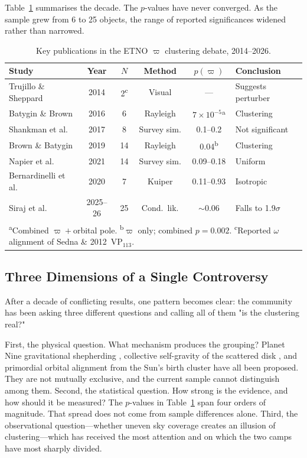 \documentclass[usenatbib]{mnras}
\begin{document}
Table~\ref{tab:timeline} summarises the decade. The $p$-values have never converged. As the sample grew from 6 to 25 objects, the range of reported significances widened rather than narrowed.

\begin{table}[htbp]
\centering
\caption{Key publications in the ETNO $\varpi$ clustering debate, 2014--2026.}
\label{tab:timeline}
\footnotesize
\begin{tabular}{p{2.8cm}ccccp{2.8cm}}
\hline
Study & Year & $N$ & Method & $p(\varpi)$ & Conclusion \\
\hline
Trujillo \& Sheppard \cite{trujillo2014} & 2014 & 2\textsuperscript{c} & Visual & --- & Suggests perturber \\
Batygin \& Brown \cite{batygin2016} & 2016 & 6 & Rayleigh & $7{\times}10^{-5}$\textsuperscript{a} & Clustering \\
Shankman et al.\ \cite{shankman2017} & 2017 & 8 & Survey sim. & 0.1--0.2 & Not significant \\
Brown \& Batygin \cite{brown2019} & 2019 & 14 & Rayleigh & 0.04\textsuperscript{b} & Clustering \\
Napier et al.\ \cite{napier2021} & 2021 & 14 & Survey sim. & 0.09--0.18 & Uniform \\
Bernardinelli et al.\ \cite{bernardinelli2020} & 2020 & 7 & Kuiper & 0.11--0.93 & Isotropic \\
Siraj et al.\ \cite{siraj2025,siraj2026} & 2025--26 & 25 & Cond.\ lik. & $\sim$0.06 & Falls to 1.9$\sigma$ \\
\hline
\multicolumn{6}{l}{\footnotesize\textsuperscript{a}Combined $\varpi{+}$orbital pole. \textsuperscript{b}$\varpi$ only; combined $p{=}0.002$. \textsuperscript{c}Reported $\omega$ alignment of Sedna \& 2012~VP$_{113}$.} \\
\end{tabular}
\end{table}

\subsection{Three Dimensions of a Single Controversy}

After a decade of conflicting results, one pattern becomes clear: the community has been asking three different questions and calling all of them "is the clustering real?"

First, the physical question. What mechanism produces the grouping? Planet Nine gravitational shepherding \cite{batygin2016,brown2019}, collective self-gravity of the scattered disk \cite{madigan2018,zderic2020}, and primordial orbital alignment from the Sun's birth cluster \cite{trujillo2014} have all been proposed. They are not mutually exclusive, and the current sample cannot distinguish among them. Second, the statistical question. How strong is the evidence, and how should it be measured? The $p$-values in Table~\ref{tab:timeline} span four orders of magnitude. That spread does not come from sample differences alone. Third, the observational question---whether uneven sky coverage creates an illusion of clustering---which has received the most attention and on which the two camps have most sharply divided.
\end{document}
